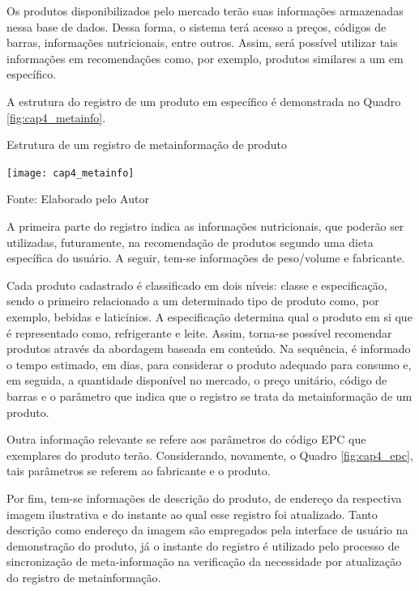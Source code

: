 
Os produtos disponibilizados pelo mercado terão suas informações armazenadas nessa base de dados. Dessa forma, o sistema terá acesso a preços, códigos de barras, informações nutricionais, entre outros. Assim, será possível utilizar tais informações em recomendações como, por exemplo, produtos similares a um em específico. 

A estrutura do registro de um produto em específico é demonstrada no Quadro \ref{fig:cap4_metainfo}.

\begin{quadro}[htb]
    \caption{Estrutura de um registro de metainformação de produto}
    \label{fig:cap4_metainfo}
    \texttt{[image: cap4\_metainfo]}
    
    \footnotesize{Fonte: Elaborado pelo Autor}
\end{quadro}

A primeira parte do registro indica as informações nutricionais, que poderão ser utilizadas, futuramente, na recomendação de produtos segundo uma dieta específica do usuário. A seguir, tem-se informações de peso/volume e fabricante.

Cada produto cadastrado é classificado em dois níveis: classe e especificação, sendo o primeiro relacionado a um determinado tipo de produto como, por exemplo, bebidas e laticínios. A especificação determina qual o produto em si que é representado como, refrigerante e leite. Assim, torna-se possível recomendar produtos através da abordagem baseada em conteúdo.
Na sequência, é informado o tempo estimado, em dias, para considerar o produto adequado para consumo e, em seguida, a quantidade disponível no mercado, o preço unitário, código de barras e o parâmetro que indica que o registro se trata da metainformação de um produto.

Outra informação relevante se refere aos parâmetros do código EPC que exemplares do produto terão. Considerando, novamente, o Quadro \ref{fig:cap4_epc}, tais parâmetros se referem ao fabricante e o produto.

Por fim, tem-se informações de descrição do produto, de endereço da respectiva imagem ilustrativa e do instante ao qual esse registro foi atualizado. Tanto descrição como endereço da imagem são empregados pela interface de usuário na demonstração do produto, já o instante do registro é utilizado pelo processo de sincronização de meta-informação na verificação da necessidade por atualização do registro de metainformação.

